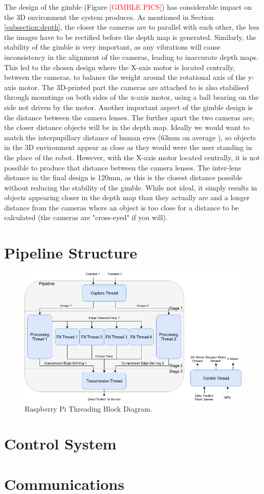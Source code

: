 The design of the gimble (Figure \textcolor{red}{[GIMBLE PICS]}) has considerable impact on the 3D environment the system produces. As mentioned in Section \ref{subsection:depth}, the closer the cameras are to parallel with each other, the less the images have to be rectified before the depth map is generated. Similarly, the stability of the gimble is very important, as any vibrations will cause inconsistency in the alignment of the cameras, leading to inaccurate depth maps. This led to the chosen design where the X-axis motor is located centrally, between the cameras, to balance the weight around the rotational axis of the y-axis motor. The 3D-printed part the cameras are attached to is also stabilised through mountings on both sides of the x-axis motor, using a ball bearing on the side not driven by the motor. Another important aspect of the gimble design is the distance between the camera lenses. The further apart the two cameras are, the closer distance objects will be in the depth map. Ideally we would want to match the interpupillary distance of human eyes (63mm on average \cite{dodgson2004variation}), so objects in the 3D environment appear as close as they would were the user standing in the place of the robot. However, with the X-axis motor located centrally, it is not possible to produce that distance between the camera lenses. The inter-lens distance in the final design is 120mm, as this is the closest distance possible without reducing the stability of the gimble. While not ideal, it simply results in objects appearing closer in the depth map than they actually are and a longer distance from the cameras where an object is too close for a distance to be calculated (the cameras are "cross-eyed" if you will).

\section{Pipeline Structure}

\begin{figure}[H]
    \begin{center}
      \includegraphics[width=1\textwidth]{Figures/Threads.png}
      \caption[Raspberry Pi Threading Block Diagram]{Raspberry Pi Threading Block Diagram.}
      \label{fig:threads}
    \end{center}
\end{figure}

\section{Control System}
\section{Communications}
\label{Subsection:comms}